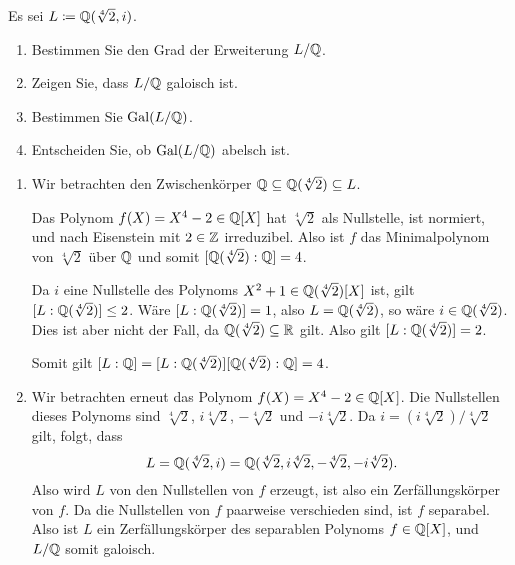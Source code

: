 \begin{question}[subtitle = {Galoisgruppe von $\Rational(\sqrt[4]{2}, i)/\Rational$}]
  Es sei $L \coloneqq \mathbb{Q}(\sqrt[4]{2}, i)$.
  \begin{enumerate}
    \item
      Bestimmen Sie den Grad der Erweiterung $L/\mathbb{Q}$.
    \item
      Zeigen Sie, dass $L/\mathbb{Q}$ galoisch ist.
    \item
      Bestimmen Sie $\operatorname{Gal}(L / \mathbb{Q})$.
    \item
      Entscheiden Sie, ob $\operatorname{Gal}(L / \mathbb{Q})$ abelsch ist.
  \end{enumerate}
\end{question}


\begin{solution}
  \begin{enumerate}
    \item
      Wir betrachten den Zwischenkörper $\mathbb{Q} \subseteq \mathbb{Q}(\sqrt[4]{2}) \subseteq L$.
      
      Das Polynom $f(X) = X^4 - 2 \in \mathbb{Q}[X]$ hat $\sqrt[4]{2}$ als Nullstelle, ist normiert, und nach Eisenstein mit $2 \in \mathbb{Z}$ irreduzibel.
      Also ist $f$ das Minimalpolynom von $\sqrt[4]{2}$ über $\mathbb{Q}$ und somit $[\mathbb{Q}(\sqrt[4]{2}) : \mathbb{Q}] = 4$.
      
      Da $i$ eine Nullstelle des Polynoms $X^2 + 1 \in \mathbb{Q}(\sqrt[4]{2})[X]$ ist, gilt $[L : \mathbb{Q}(\sqrt[4]{2})] \leq 2$.
      Wäre $[L : \mathbb{Q}(\sqrt[4]{2})] = 1$, also $L = \mathbb{Q}(\sqrt[4]{2})$, so wäre $i \in \mathbb{Q}(\sqrt[4]{2})$.
      Dies ist aber nicht der Fall, da $\mathbb{Q}(\sqrt[4]{2}) \subseteq \mathbb{R}$ gilt.
      Also gilt $[L : \mathbb{Q}(\sqrt[4]{2})] = 2$.
      
      Somit gilt $[L : \mathbb{Q}] = [L : \mathbb{Q}(\sqrt[4]{2})] [\mathbb{Q}(\sqrt[4]{2}) : \mathbb{Q}] = 4$.
      
    \item
      Wir betrachten erneut das Polynom $f(X) = X^4 - 2 \in \mathbb{Q}[X]$.
      Die Nullstellen dieses Polynoms sind $\sqrt[4]{2}$, $i\sqrt[4]{2}$, $-\sqrt[4]{2}$ und $-i\sqrt[4]{2}$.
      Da $i = (i\sqrt[4]{2})/\sqrt[4]{2}$ gilt, folgt, dass
      \[
          L
        = \mathbb{Q}(\sqrt[4]{2}, i)
        = \mathbb{Q}(\sqrt[4]{2}, i\sqrt[4]{2}, -\sqrt[4]{2}, -i\sqrt[4]{2}).
      \]
      Also wird $L$ von den Nullstellen von $f$ erzeugt, ist also ein Zerfällungskörper von $f$.
      Da die Nullstellen von $f$ paarweise verschieden sind, ist $f$ separabel.
      Also ist $L$ ein Zerfällungskörper des separablen Polynoms $f \in \mathbb{Q}[X]$, und $L/\mathbb{Q}$ somit galoisch.
    

\end{enumerate}
\end{solution}

